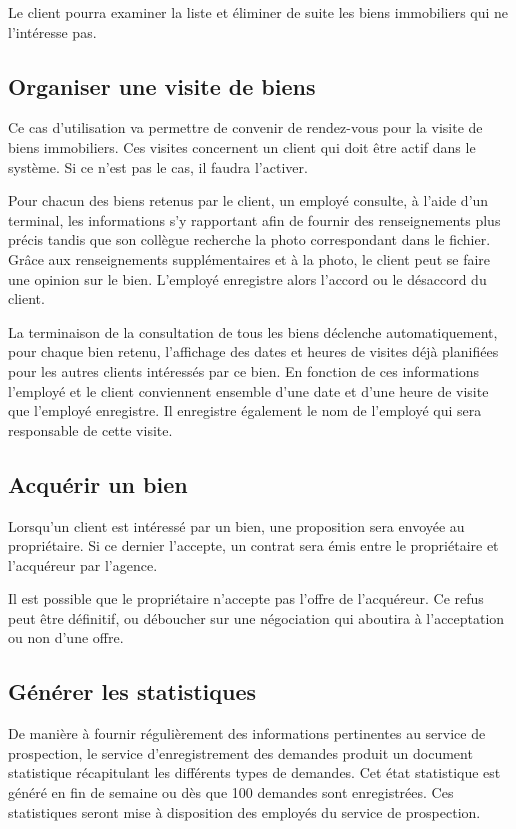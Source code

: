 Le client pourra examiner la liste et éliminer de suite les biens immobiliers qui ne l'intéresse pas.

\subsection{Organiser une visite de biens}
\label{section_UC_organiser_une_visite_de_biens}

Ce cas d'utilisation va permettre de convenir de rendez-vous pour la visite de biens immobiliers. Ces visites concernent un client qui doit être actif dans le système. Si ce n'est pas le cas, il faudra l'activer.

Pour chacun des biens retenus par le client, un employé consulte, à l'aide d'un terminal, les informations s'y rapportant afin de fournir des renseignements plus précis tandis que son collègue recherche la photo correspondant dans le fichier. Grâce aux renseignements supplémentaires et à la photo, le client peut se faire une opinion sur le bien. L'employé enregistre alors l'accord ou le désaccord du client.

La terminaison de la consultation de tous les biens déclenche automatiquement, pour chaque bien retenu, l'affichage des dates et heures de visites déjà planifiées pour les autres clients intéressés par ce bien. En fonction de ces informations l'employé et le client conviennent ensemble d'une date et d'une heure de visite que l'employé enregistre. Il enregistre également le nom de l'employé qui sera responsable de cette visite.

\subsection{Acquérir un bien}

Lorsqu'un client est intéressé par un bien, une proposition sera envoyée au propriétaire. Si ce dernier l'accepte, un contrat sera émis entre le propriétaire et l'acquéreur par l'agence.

Il est possible que le propriétaire n'accepte pas l'offre de l'acquéreur. Ce refus peut être définitif, ou déboucher sur une négociation qui aboutira à l'acceptation ou non d'une offre.

\subsection{Générer les statistiques}

De manière à fournir régulièrement des informations pertinentes au service de prospection, le service d'enregistrement des demandes produit un document statistique récapitulant les différents types de demandes. Cet état statistique est généré en fin de semaine ou dès que 100 demandes sont enregistrées. Ces statistiques seront mise à disposition des employés du service de prospection.

